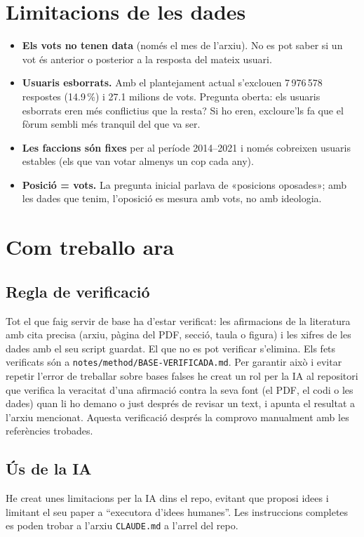 \documentclass[11pt,a4paper]{article}
\newcommand{\code}[1]{\texttt{\small #1}}
\begin{document}
\section{Limitacions de les dades}
\begin{itemize}
  \item \textbf{Els vots no tenen data} (només el mes de l'arxiu). No es pot saber si un vot és anterior o posterior a la resposta del mateix usuari.
  \item \textbf{Usuaris esborrats.} Amb el plantejament actual s'exclouen 7\,976\,578 respostes (14.9\,\%) i 27.1 milions de vots. Pregunta oberta: els usuaris esborrats eren més conflictius que la resta? Si ho eren, excloure'ls fa que el fòrum sembli més tranquil del que va ser.
  \item \textbf{Les faccions són fixes} per al període 2014--2021 i només cobreixen usuaris estables (els que van votar almenys un cop cada any).
  \item \textbf{Posició = vots.} La pregunta inicial parlava de «posicions oposades»; amb les dades que tenim, l'oposició es mesura amb vots, no amb ideologia.
\end{itemize}

\section{Com treballo ara}

\subsection{Regla de verificació}
Tot el que faig servir de base ha d'estar verificat: les afirmacions de la literatura amb cita precisa (arxiu, pàgina del PDF, secció, taula o figura) i les xifres de les dades amb el seu script guardat. El que no es pot verificar s'elimina. Els fets verificats són a \code{notes/method/BASE-VERIFICADA.md}. Per garantir això i evitar repetir l'error de treballar sobre bases falses he creat un rol per la IA al repositori que verifica la veracitat d'una afirmació contra la seva font (el PDF, el codi o les dades) quan li ho demano o just després de revisar un text, i apunta el resultat a l'arxiu mencionat. Aquesta verificació després la comprovo manualment amb les referències trobades.

\subsection{Ús de la IA}
He creat unes limitacions per la IA dins el repo, evitant que proposi idees i limitant el seu paper a ``executora d'idees humanes''. Les instruccions completes es poden trobar a l'arxiu \code{CLAUDE.md} a l'arrel del repo.
\end{document}
